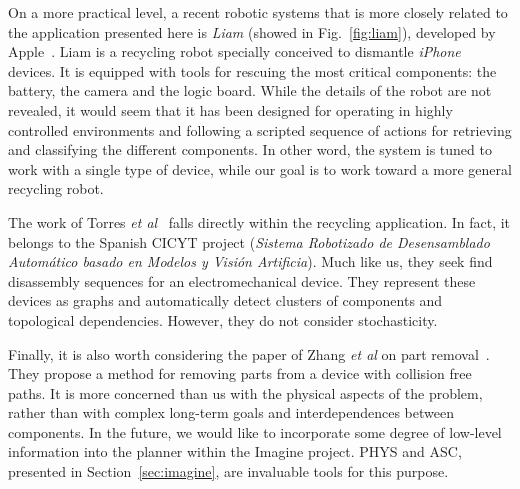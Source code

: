 \documentclass[../root.tex]{subfiles}
\begin{document}
On a more practical level, a recent robotic systems that is more
closely related to the application
presented here is \emph{Liam} (showed in Fig.~\ref{fig:liam}), developed by Apple~\cite{kamps2016apple}.
Liam is a recycling robot specially conceived to dismantle \emph{iPhone}
devices. It is equipped with tools for rescuing the most critical components:
the battery, the camera and the logic board. While the details of the robot
are not revealed, it would seem that it has been designed for operating
in highly controlled environments and following a scripted sequence of
actions for retrieving and classifying the different components. In other
word, the system is tuned to work with a single type of device, while our
goal is to work toward a more general recycling robot.

The work of Torres \textit{et al}~\cite{torresa2003disassembly} falls
directly within the recycling application. In fact, it belongs to the
Spanish CICYT project (\emph{Sistema Robotizado de Desensamblado
Automático basado en Modelos y Visión Artificia}). Much like us, they
seek find disassembly sequences for an electromechanical device. They
represent these devices as graphs and automatically detect clusters of
components and topological dependencies. However, they do not consider
stochasticity.

Finally, it is also worth considering the paper of
Zhang \textit{et al} on part removal~\cite{zhang2008dplan}. They propose
a method for removing parts from a device with collision free paths. It
is more concerned than us with the physical aspects of the problem,
rather than with complex long-term goals and interdependences between
components. In the future, we would like to incorporate some degree
of low-level information into the planner within the Imagine project.
PHYS and ASC, presented in Section~\ref{sec:imagine}, are invaluable
tools for this purpose.


\end{document}
